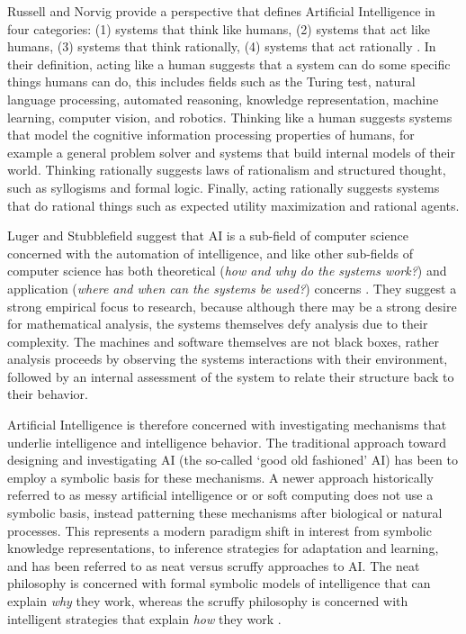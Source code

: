 \documentclass[a4paper, 11pt]{article}
\begin{document}
Russell and Norvig provide a perspective that defines Artificial Intelligence in four categories: (1) systems that think like humans, (2) systems that act like humans, (3) systems that think rationally, (4) systems that act rationally \cite{Russell2009}. In their definition, acting like a human suggests that a system can do some specific things humans can do, this includes fields such as the Turing test, natural language processing, automated reasoning, knowledge representation, machine learning, computer vision, and robotics. Thinking like a human suggests systems that model the cognitive information processing properties of humans, for example a general problem solver and systems that build internal models of their world. Thinking rationally suggests laws of rationalism and structured thought, such as syllogisms and formal logic. Finally, acting rationally suggests systems that do rational things such as expected utility maximization and rational agents. 

Luger and Stubblefield suggest that AI is a sub-field of computer science concerned with the automation of intelligence, and like other sub-fields of computer science has both theoretical (\emph{how and why do the systems work?}) and application (\emph{where and when can the systems be used?}) concerns \cite{Luger1993}. They suggest a strong empirical focus to research, because although there may be a strong desire for mathematical analysis, the systems themselves defy analysis due to their complexity. The machines and software themselves are not black boxes, rather analysis proceeds by observing the systems interactions with their environment, followed by an internal assessment of the system to relate their structure back to their behavior.

Artificial Intelligence is therefore concerned with investigating mechanisms that underlie intelligence and intelligence behavior. The traditional approach toward designing and investigating AI (the so-called `good old fashioned' AI) has been to employ a symbolic basis for these mechanisms. A newer approach historically referred to as messy artificial intelligence or or soft computing does not use a symbolic basis, instead patterning these mechanisms after biological or natural processes. This represents a modern paradigm shift in interest from symbolic knowledge representations, to inference strategies for adaptation and learning, and has been referred to as neat versus scruffy approaches to AI. The neat philosophy is concerned with formal symbolic models of intelligence that can explain \emph{why} they work, whereas the scruffy philosophy is concerned with intelligent strategies that explain \emph{how} they work \cite{Sloman1990}.
\end{document}
